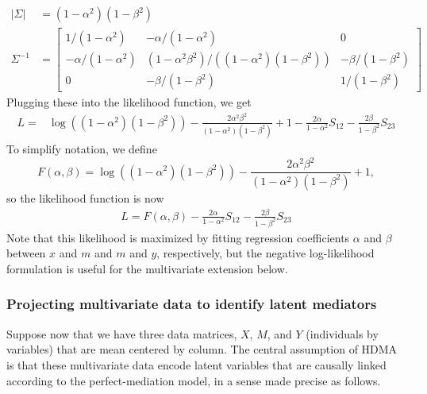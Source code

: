 \documentclass[
]{article}
\begin{document}
\begin{align}
\left|\Sigma\right| &= (1-\alpha^2)(1-\beta^2) \\
\Sigma^{-1} &= 
  \begin{bmatrix}
1/(1-\alpha^2) & -\alpha/(1-\alpha^2) & 0 \\
-\alpha/(1-\alpha^2) & (1-\alpha^2\beta^2)/\left((1-\alpha^2)(1-\beta^2)\right) & -\beta/(1-\beta^2) \\
0 & -\beta/(1-\beta^2) & 1/(1-\beta^2)
\end{bmatrix}
\end{align} Plugging these into the likelihood function, we get
\begin{align}
\label{eqn:mediation_loglikelihood}
L = &\log\left((1-\alpha^2)(1-\beta^2)\right) - \frac{2\alpha^2\beta^2}{(1-\alpha^2)(1-\beta^2)} + 1 - \frac{2\alpha}{1-\alpha^2} S_{12} - \frac{2\beta}{1-\beta^2} S_{23}
\end{align} To simplify notation, we define \begin{equation}
F(\alpha,\beta) = \log\left((1-\alpha^2)(1-\beta^2)\right) - \frac{2\alpha^2\beta^2}{(1-\alpha^2)(1-\beta^2)} + 1,
\end{equation} so the likelihood function is now \begin{align}
\label{eqn:mediation_loglikelihood_simple}
L = F(\alpha, \beta) - \frac{2\alpha}{1-\alpha^2} S_{12} - \frac{2\beta}{1-\beta^2} S_{23}
\end{align} Note that this likelihood is maximized by fitting regression
coefficients \(\alpha\) and \(\beta\) between \(x\) and \(m\) and \(m\)
and \(y\), respectively, but the negative log-likelihood formulation is
useful for the multivariate extension below.

\subsubsection{Projecting multivariate data to identify latent
mediators}\label{projecting-multivariate-data-to-identify-latent-mediators}

Suppose now that we have three data matrices, \(X\), \(M\), and \(Y\)
(individuals by variables) that are mean centered by column. The central
assumption of HDMA is that these multivariate data encode latent
variables that are causally linked according to the perfect-mediation
model, in a sense made precise as follows.
\end{document}
